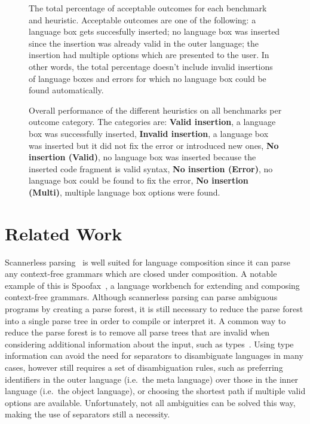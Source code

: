 \documentclass[sigplan,screen]{acmart}\settopmatter{printfolios=true,printccs=false,printacmref=false}
\begin{document}
\begin{figure}[hbt]
    
    \caption{The total percentage of acceptable outcomes for each benchmark and
    heuristic. Acceptable outcomes are one of the following: a language box
    gets succesfully inserted; no language box was inserted since the insertion
    was already valid in the outer language; the insertion had multiple options
    which are presented to the user. In other words, the total percentage
    doesn't include invalid insertions of language boxes and errors for which
    no language box could be found automatically.}
    \label{tbl_valid}
\end{figure}

\begin{figure}[hbt]
    
    \caption{Overall performance of the different
    heuristics on all benchmarks per outcome category. The categories are:
    \textbf{Valid insertion}, a language box was successfully inserted, \textbf{Invalid insertion},
    a language box was inserted but it did not fix the error or introduced new
    ones, \textbf{No insertion (Valid)}, no language box was inserted because the inserted
    code fragment is valid syntax, \textbf{No insertion (Error)}, no language box could be
    found to fix the error, \textbf{No insertion (Multi)}, multiple language box options
    were found.}
    \label{tbl_breakdown}
\end{figure}


\section{Related Work}
\label{autobox_related_work}

Scannerless parsing~\cite{visser97scannerless, vandenbrand02disambiguation} is well
suited for language composition since it can parse any context-free grammars
which are closed under composition. A notable example of this is
Spoofax~\cite{kats10spoofax}, a language workbench for extending and composing
context-free grammars.
Although scannerless parsing can parse ambiguous programs by creating a parse
forest, it is still necessary to reduce the parse forest into a single
parse tree in order to compile or interpret it. A common way to reduce the parse forest is to
remove all parse trees that are invalid when considering additional information
about the input, such as types~\cite{vinju05typedriven}. Using type information can avoid the
need for separators to disambiguate languages in many cases, however still
requires a set of disambiguation rules, such as preferring identifiers in the
outer language (i.e.~the meta language) over those in the inner language
(i.e.~the object language), or choosing the shortest path if multiple valid
options are available. Unfortunately, not all ambiguities can be solved this
way, making the use of separators still a necessity.
\end{document}
